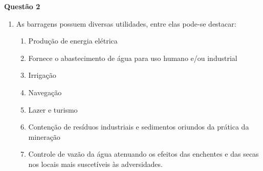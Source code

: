 \item[]\textbf{Questão 2}

\begin{enumerate}
	\item As barragens possuem diversas utilidades, entre elas pode-se destacar:
	\begin{enumerate}
		\item Produção de energia elétrica
		\item Fornece o abastecimento de água para uso humano e/ou industrial
		\item Irrigação
		\item Navegação
		\item Lazer e turismo
		\item Contenção de resíduos industriais e sedimentos oriundos da prática da mineração
		\item Controle de vazão da água atenuando os efeitos das enchentes e das secas nos locais mais suscetíveis às adversidades.
	\end{enumerate}
\end{enumerate}
